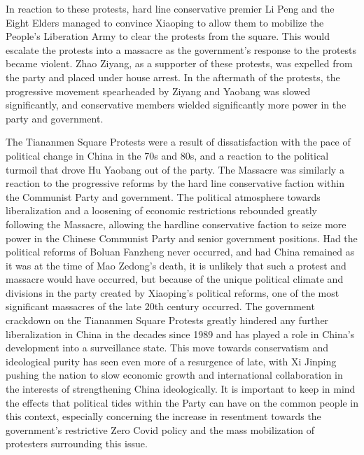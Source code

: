 \documentclass{paper}
\begin{document}
In reaction to these protests, hard line conservative premier Li Peng and the Eight Elders managed to convince Xiaoping to allow them to mobilize the People's Liberation Army to clear the protests from the square.
This would escalate the protests into a massacre as the government's response to the protests became violent.
Zhao Ziyang, as a supporter of these protests, was expelled from the party and placed under house arrest.\autocite{tiananmen}
In the aftermath of the protests, the progressive movement spearheaded by Ziyang and Yaobang was slowed significantly, and conservative members wielded significantly more power in the party and government.

The Tiananmen Square Protests were a result of dissatisfaction with the pace of political change in China in the 70s and 80s, and a reaction to the political turmoil that drove Hu Yaobang out of the party.
The Massacre was similarly a reaction to the progressive reforms by the hard line conservative faction within the Communist Party and government.
The political atmosphere towards liberalization and a loosening of economic restrictions rebounded greatly following the Massacre, allowing the hardline conservative faction to seize more power in the Chinese Communist Party and senior government positions.
Had the political reforms of Boluan Fanzheng never occurred, and had China remained as it was at the time of Mao Zedong's death, it is unlikely that such a protest and massacre would have occurred, but because of the unique political climate and divisions in the party created by Xiaoping's political reforms, one of the most significant massacres of the late 20th century occurred.
The government crackdown on the Tiananmen Square Protests greatly hindered any further liberalization in China in the decades since 1989 and has played a role in China's development into a surveillance state.
This move towards conservatism and ideological purity has seen even more of a resurgence of late, with Xi Jinping pushing the nation to slow economic growth and international collaboration in the interests of strengthening China ideologically.
It is important to keep in mind the effects that political tides within the Party can have on the common people in this context, especially concerning the increase in resentment towards the government's restrictive Zero Covid policy and the mass mobilization of protesters surrounding this issue.
%
\newpage
%
\end{document}
